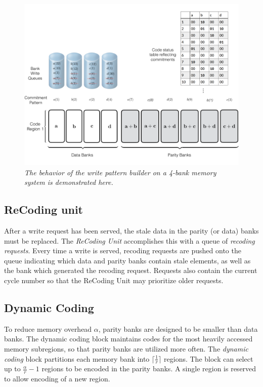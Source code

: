\begin{figure}[t!]
\centering
         \includegraphics[width=\linewidth]{fig/Write-Algo-Example.png}
	\caption{\it{The behavior of the write pattern builder on a 4-bank memory system is demonstrated here.}}
	\label{fig:writeAlgoAccessPattern}
\end{figure}
\subsection{ReCoding unit}
\label{sec:recoding}
After a write request has been served, the stale data in the parity (or data) banks must be replaced. The \textit{ReCoding Unit} accomplishes this with a queue of {\em recoding requests}. Every time a write is served, recoding requests are pushed onto the queue indicating which data and parity banks contain stale elements, as well as the bank which generated the recoding request. Requests also contain the current cycle number so that the ReCoding Unit may prioritize older requests.

\subsection{Dynamic Coding}
\label{sec:dynamicCoding}
To reduce memory overhead $\alpha$, parity banks are designed to be smaller than data banks. The dynamic coding block maintains codes for the most heavily accessed memory subregions, so that parity banks are utilized more often.
%
%
The {\em dynamic coding} block partitions each memory bank into $\lceil\frac{1}{r}\rceil$ regions. The block can select up to $\frac{\alpha}{r} - 1$ regions to be encoded in the parity banks. A single region is reserved to allow encoding of a new region.

